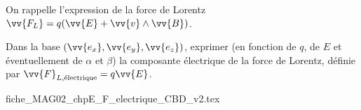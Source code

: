 
\finEntrainement
















\bigskip

On rappelle l'expression de la force de Lorentz $\vv{F_L}=q(\vv{E}+\vv{v}\wedge \vv{B})$.




\hauteurLargeurCadreReponse		{8mm}{5cm}
\initialisationEntrainement



Dans la base $\left(\vv{e_{x}},\vv{e_{y}},\vv{e_{z}}\right)$,
exprimer (en fonction de $q$, de $E$ et éventuellement de $\alpha$ et $\beta$) la composante électrique de la force de Lorentz, définie par $\vv{F}_{L,\text{électrique}}=q\vv{E}$.


\begin{center}
{fiche_MAG02_chpE_F_electrique_CBD_v2.tex}
\end{center}


